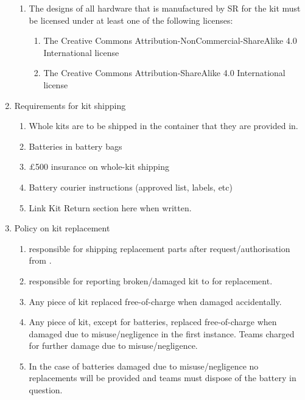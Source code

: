 \begin{draft}
\begin{enumerate}
\begin{enumerate}
  \item The designs of all hardware that is manufactured by SR for the kit must be licensed under at least one of the following licenses:
    \begin{enumerate}
    \item The Creative Commons Attribution-NonCommercial-ShareAlike 4.0 International license
    \item The Creative Commons Attribution-ShareAlike 4.0 International license
    \end{enumerate}
  \end{enumerate}


\item Requirements for kit shipping
  \begin{enumerate}
    \item{Whole kits are to be shipped in the container that they are provided in.}
    \item{Batteries in battery bags}
    \item{\pounds500 insurance on whole-kit shipping}
    \item{Battery courier instructions (approved list, labels, etc)}
    \item{Link Kit Return section here when written.}
  \end{enumerate}
\item Policy on kit replacement
  \begin{enumerate}
    \item{ responsible for shipping replacement parts after request/authorisation from .}
    \item{ responsible for reporting broken/damaged kit to  for replacement.}
    \item{Any piece of kit replaced free-of-charge when damaged accidentally.}
    \item{Any piece of kit, except for batteries, replaced free-of-charge when damaged due to misuse/negligence in the first instance. Teams charged for further damage due to misuse/negligence.}
    \item{In the case of batteries damaged due to misuse/negligence no replacements will be provided and teams must dispose of the battery in question.}
  \end{enumerate}


\end{enumerate}
\end{draft}
